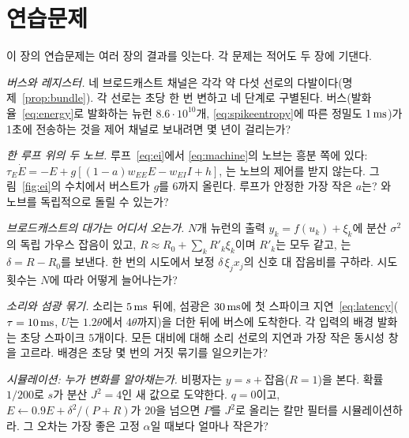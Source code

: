 \section{연습문제}

이 장의 연습문제는 여러 장의 결과를 잇는다. 각 문제는 적어도 두 장에 기댄다.

\begin{exercise}[\lvlA]
\label{ex:10:1}
\emph{버스와 레지스터.} 네 브로드캐스트 채널은 각각 약 다섯 선로의 다발이다(명제~\ref{prop:bundle}). 각 선로는 초당 한 번 변하고 네 단계로 구별된다.  버스(발화율~\eqref{eq:energy}로 발화하는 뉴런 $8.6\cdot10^{10}$개, \eqref{eq:spikeentropy}에 따른 정밀도 $1\,\text{ms}$)가 1초에 전송하는 것을 제어 채널로 보내려면 몇 년이 걸리는가?
\end{exercise}

\begin{exercise}[\lvlB]
\label{ex:10:2}
\emph{한 루프 위의 두 노브.} 루프~\eqref{eq:ei}에서 \eqref{eq:machine}의 노브는 흥분 쪽에 있다: $\tau_E\dot E=-E+g[(1-a)w_{EE}E-w_{EI}I+h]$, 는 노브의 제어를 받지 않는다. 그림~\ref{fig:ei}의 수치에서  버스트가 $g$를 $6$까지 올린다. 루프가 안정한 가장 작은 $a$는? 와  노브를 독립적으로 돌릴 수 있는가?
\end{exercise}

\begin{exercise}[\lvlB]
\label{ex:10:3}
\emph{브로드캐스트의 대가는 어디서 오는가.} $N$개 뉴런의 출력 $y_k=f(u_k)+\xi_k$에 분산 $\sigma^2$의 독립 가우스 잡음이 있고, $R\approx R_0+\sum_kR'_k\xi_k$이며 $R'_k$는 모두 같고, 는 $\delta=R-R_0$를 보낸다. 한 번의 시도에서 보정 $\delta\,\xi_jx_j$의 신호 대 잡음비를 구하라. 시도 횟수는 $N$에 따라 어떻게 늘어나는가?
\end{exercise}

\begin{exercise}[\lvlB]
\label{ex:10:4}
\emph{소리와 섬광 묶기.} 소리는 $5\,\text{ms}$ 뒤에, 섬광은 $30\,\text{ms}$에 첫 스파이크 지연~\eqref{eq:latency}($\tau=10\,\text{ms}$, $U$는 $1.2\theta$에서 $4\theta$까지)을 더한 뒤에 버스에 도착한다. 각 입력의 배경 발화는 초당 스파이크 $5$개이다. 모든 대비에 대해 소리 선로의 지연과 가장 작은 동시성 창을 고르라. 배경은 초당 몇 번의 거짓 묶기를 일으키는가?
\end{exercise}

\begin{exercise}[\lvlB]
\label{ex:10:5}
\emph{시뮬레이션: 누가 변화를 알아채는가.} 비평자는 $y=s+\text{잡음}$($R=1$)을 본다. 확률 $1/200$로 $s$가 분산 $J^2=4$인 새 값으로 도약한다. $q=0$이고, $E\leftarrow0.9E+\delta^2/(P+R)$가 $20$을 넘으면 $P$를 $J^2$로 올리는 칼만 필터를 시뮬레이션하라. 그 오차는 가장 좋은 고정 $\alpha$일 때보다 얼마나 작은가?
\end{exercise}

